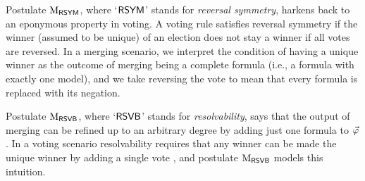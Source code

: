 Postulate $\ppm{\RSYM}$, where `$\RSYM$' stands for \emph{reversal symmetry},
harkens back to an eponymous property in voting.
A voting rule satisfies reversal symmetry if the 
winner (assumed to be unique) of an election does not stay a winner
if all votes are reversed.
In a merging scenario, we interpret the condition of having a unique winner 
as the outcome of merging 
being a complete formula (i.e., a formula with exactly one model), 
and we take reversing the vote to mean that every formula 
is replaced with its negation.

Postulate $\ppm{\RSVB}$, where `$\RSVB$' stands for \emph{resolvability},
says that the output of merging can be refined up to an arbitrary degree 
by adding just one formula to $\P$.
In a voting scenario resolvability 
requires that any winner can be made 
the unique winner by adding a single vote \cite{Tideman06},
and postulate $\ppm{\RSVB}$ models this intuition. 





